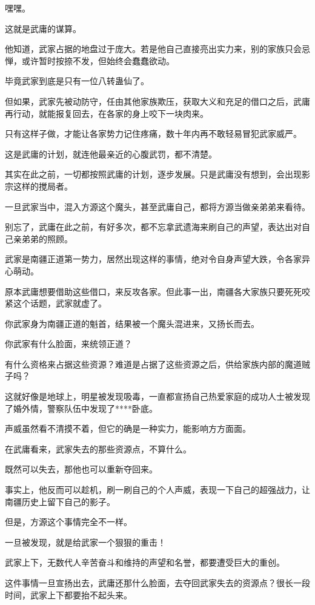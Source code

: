 \begin{this_body}
嘿嘿。

这就是武庸的谋算。

他知道，武家占据的地盘过于庞大。若是他自己直接亮出实力来，别的家族只会忌惮，或许暂时按捺不发，但始终会蠢蠢欲动。

毕竟武家到底是只有一位八转蛊仙了。

但如果，武家先被动防守，任由其他家族欺压，获取大义和充足的借口之后，武庸再行动，就能报复回去，在各家的身上咬下一块肉来。

只有这样子做，才能让各家势力记住疼痛，数十年内再不敢轻易冒犯武家威严。

这是武庸的计划，就连他最亲近的心腹武罚，都不清楚。

其实在此之前，一切都按照武庸的计划，逐步发展。只是武庸没有想到，会出现影宗这样的搅局者。

一旦武家当中，混入方源这个魔头，甚至武庸自己，都将方源当做亲弟弟来看待。

别忘了，武庸在此之前，有好多次，都不忘拿武遗海来刷自己的声望，表达出对自己亲弟弟的照顾。

武家是南疆正道第一势力，居然出现这样的事情，绝对令自身声望大跌，令各家异心萌动。

原本武庸想要借助这些借口，来反攻各家。但此事一出，南疆各大家族只要死死咬紧这个话题，武家就虚了。

你武家身为南疆正道的魁首，结果被一个魔头混进来，又扬长而去。

你武家有什么脸面，来统领正道？

有什么资格来占据这些资源？难道是占据了这些资源之后，供给家族内部的魔道贼子吗？

这就好像是地球上，明星被发现吸毒，一直都宣扬自己热爱家庭的成功人士被发现了婚外情，警察队伍中发现了****卧底。

声威虽然看不清摸不着，但它的确是一种实力，能影响方方面面。

在武庸看来，武家失去的那些资源点，不算什么。

既然可以失去，那他也可以重新夺回来。

事实上，他反而可以趁机，刷一刷自己的个人声威，表现一下自己的超强战力，让南疆历史上留下自己的影子。

但是，方源这个事情完全不一样。

一旦被发现，就是给武家一个狠狠的重击！

武家上下，无数代人辛苦奋斗和维持的声望和名誉，都要遭受巨大的重创。

这件事情一旦宣扬出去，武庸还那什么脸面，去夺回武家失去的资源点？很长一段时间，武家上下都要抬不起头来。


\end{this_body}
